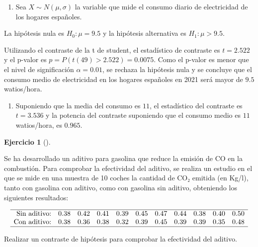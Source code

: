 \documentclass[
  a4paper,
]{scrreport}
\providecommand{\tightlist}{%
  \setlength{\itemsep}{0pt}\setlength{\parskip}{0pt}}\usepackage{longtable,booktabs,array}
\theoremstyle{definition}
\newtheorem{exercise}{Ejercicio}[chapter]
\theoremstyle{remark}
\begin{document}
\begin{tcolorbox}[enhanced jigsaw, colbacktitle=quarto-callout-tip-color!10!white, bottomrule=.15mm, bottomtitle=1mm, rightrule=.15mm, colback=white, left=2mm, opacityback=0, title=\textcolor{quarto-callout-tip-color}{\faLightbulb}\hspace{0.5em}{Solución}, leftrule=.75mm, arc=.35mm, titlerule=0mm, coltitle=black, opacitybacktitle=0.6, colframe=quarto-callout-tip-color-frame, breakable, toprule=.15mm, toptitle=1mm]

\begin{enumerate}
\def\labelenumi{\alph{enumi}.}
\tightlist
\item
  Sea \(X\sim N(\mu,\sigma)\) la variable que mide el consumo diario de
  electricidad de los hogares españoles.
\end{enumerate}

La hipótesis nula es \(H_0: \mu=9.5\) y la hipótesis alternativa es
\(H_1: \mu> 9.5\).

Utilizando el contraste de la t de student, el estadístico de contraste
es \(t=2.522\) y el p-valor es \(p = P(t(49)>2.522) = 0.0075\). Como el
p-valor es menor que el nivel de significación \(\alpha = 0.01\), se
rechaza la hipótesis nula y se concluye que el consumo medio de
electricidad en los hogares españoles en 2021 será mayor de \(9.5\)
watios/hora.

\begin{enumerate}
\def\labelenumi{\alph{enumi}.}
\tightlist
\item
  Suponiendo que la media del consumo es \(11\), el estadístico del
  contraste es \(t = 3.536\) y la potencia del contraste suponiendo que
  el consumo medio es \(11\) watios/hora, es \(0.965\).
\end{enumerate}

\end{tcolorbox}

\begin{exercise}[]\protect\hypertarget{exr-contraste-media-emision-CO2}{}\label{exr-contraste-media-emision-CO2}

Se ha desarrollado un aditivo para gasolina que reduce la emisión de CO
en la combustión. Para comprobar la efectividad del aditivo, se realiza
un estudio en el que se mide en una muestra de 10 coches la cantidad de
CO₂ emitida (en Kg/l), tanto con gasolina con aditivo, como con gasolina
sin aditivo, obteniendo los siguientes resultados:

\[
\begin{array}{rcccccccccc}
\hline
\mbox{Sin aditivo:}  & 0.38 & 0.42 & 0.41 & 0.39 & 0.45 & 0.47 & 0.44 & 0.38 & 0.40 & 0.50  \\
\mbox{Con  aditivo:} & 0.38 & 0.36 & 0.38 & 0.32 & 0.39 & 0.45 & 0.39 & 0.39 & 0.35 & 0.48 \\
\hline
\end{array}
\]

Realizar un contraste de hipótesis para comprobar la efectividad del
aditivo.

\end{exercise}
\end{document}
